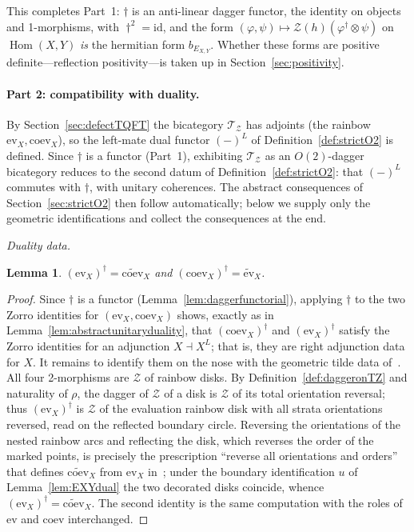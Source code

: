 \documentclass[11pt]{article}
\newtheorem{lemma}[theorem]{Lemma}
\theoremstyle{definition}
\newcommand{\cT}{\mathcal{T}}
\newcommand{\cZ}{\mathcal{Z}}
\newcommand{\Or}{O} %
\newcommand{\dg}{\dagger}
\begin{document}
This completes Part~1: $\dg$ is an anti-linear dagger functor, the identity on objects and 1-morphisms, with $\dg^2 = \mathrm{id}$, and the form $(\varphi, \psi) \mapsto \cZ(h)(\varphi^\dg \otimes \psi)$ on $\operatorname{Hom}(X,Y)$ \emph{is} the hermitian form $b_{E_{X,Y}}$. Whether these forms are positive definite---reflection positivity---is taken up in Section~\ref{sec:positivity}.

\paragraph{Part 2: compatibility with duality.}

By Section~\ref{sec:defectTQFT} the bicategory $\cT_\cZ$ has adjoints (the rainbow $\mathrm{ev}_X, \mathrm{coev}_X$), so the left-mate dual functor $(-)^L$ of Definition~\ref{def:strictO2} is defined. Since $\dg$ is a functor (Part~1), exhibiting $\cT_\cZ$ as an $\Or(2)$-dagger bicategory reduces to the second datum of Definition~\ref{def:strictO2}: that $(-)^L$ commutes with $\dg$, with unitary coherences. The abstract consequences of Section~\ref{sec:strictO2} then follow automatically; below we supply only the geometric identifications and collect the consequences at the end.

\emph{Duality data.}

\begin{lemma}
\label{lem:unitaryduality}
$(\mathrm{ev}_X)^\dg = \widetilde{\mathrm{coev}}_X$ and $(\mathrm{coev}_X)^\dg = \widetilde{\mathrm{ev}}_X$.
\end{lemma}

\begin{proof}
Since $\dg$ is a functor (Lemma~\ref{lem:daggerfunctorial}), applying $\dg$ to the two Zorro identities for $(\mathrm{ev}_X, \mathrm{coev}_X)$ shows, exactly as in Lemma~\ref{lem:abstractunitaryduality}, that $(\mathrm{coev}_X)^\dg$ and $(\mathrm{ev}_X)^\dg$ satisfy the Zorro identities for an adjunction $X \dashv X^L$; that is, they are right adjunction data for $X$. It remains to identify them on the nose with the geometric tilde data of~\cite{Car16}. All four 2-morphisms are $\cZ$ of rainbow disks. By Definition~\ref{def:daggeronTZ} and naturality of $\rho$, the dagger of $\cZ$ of a disk is $\cZ$ of its total orientation reversal; thus $(\mathrm{ev}_X)^\dg$ is $\cZ$ of the evaluation rainbow disk with all strata orientations reversed, read on the reflected boundary circle. Reversing the orientations of the nested rainbow arcs and reflecting the disk, which reverses the order of the marked points, is precisely the prescription ``reverse all orientations and orders'' that defines $\widetilde{\mathrm{coev}}_X$ from $\mathrm{ev}_X$ in~\cite[eqs.~(2.18),(2.19)]{Car16}; under the boundary identification $u$ of Lemma~\ref{lem:EXYdual} the two decorated disks coincide, whence $(\mathrm{ev}_X)^\dg = \widetilde{\mathrm{coev}}_X$. The second identity is the same computation with the roles of $\mathrm{ev}$ and $\mathrm{coev}$ interchanged.
\end{proof}
\end{document}
